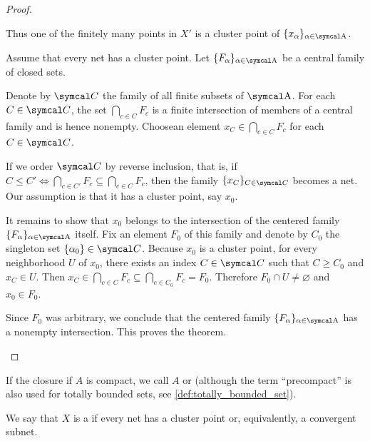 \begin{proof}
\begin{description}
    Thus one of the finitely many points in \( X' \) is a cluster point of \( \{ x_\al \}_{\al \in \CA} \).

    \cite[theorem 3.1.23]{Engelking1989} Assume that every net has a cluster point. Let \( \{ F_\al \}_{\al \in \CA} \) be a central family of closed sets.

    Denote by \( \Cal C \) the family of all finite subsets of \( \CA \). For each \( C \in \Cal C \), the set \( \bigcap_{c \in C} F_c \) is a finite intersection of members of a central family and is hence nonempty. Choose\AOC an element \( x_C \in \bigcap_{c \in C} F_c \) for each \( C \in \Cal C \).

    If we order \( \Cal C \) by reverse inclusion, that is, if \( C \leq C' \iff \bigcap_{c \in C'} F_c \subseteq \bigcap_{c \in C} F_c \), then the family \( \{ x_C \}_{C \in \Cal C} \) becomes a net. Our assumption is that it has a cluster point, say \( x_0 \).

    It remains to show that \( x_0 \) belongs to the intersection of the centered family \( \{ F_\al \}_{\al \in \CA} \) itself. Fix an element \( F_0 \) of this family and denote by \( C_0 \) the singleton set \( \{ \al_0 \} \in \Cal C \). Because \( x_0 \) is a cluster point, for every neighborhood \( U \) of \( x_0 \), there exists an index \( C \in \Cal C \) such that \( C \geq C_0 \) and \( x_C \in U \). Then \( x_C \in \bigcap_{c \in C} F_c \subseteq \bigcap_{c \in C_0} F_c = F_0 \). Therefore \( F_0 \cap U \neq \varnothing \) and \( x_0 \in F_0 \).

    Since \( F_0 \) was arbitrary, we conclude that the centered family \( \{ F_\al \}_{\al \in \CA} \) has a nonempty intersection. This proves the theorem.
  \end{description}
\end{proof}

\begin{remark}\label{remark:precompact_set}
  If the closure if \( A \) is compact, we call \( A \)  or  (although the term \enquote{precompact} is also used for totally bounded sets, see \ref{def:totally_bounded_set}).
\end{remark}

\begin{definition}\label{def:sequentially_compact_space}
  We say that \( X \) is a  if every net has a cluster point or, equivalently, a convergent subnet.
\end{definition}

